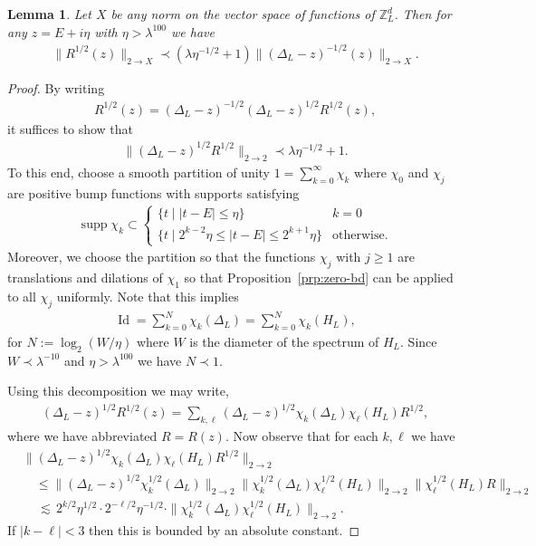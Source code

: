 \documentclass[11pt]{amsart}
\def\bbZ{{\mathbb Z}}
\newcommand{\Id}{{\operatorname*{Id}}}
\newcommand{\supp}{\operatorname*{supp}}
\def\lsim{{\,\lesssim\,}}
\newcommand{\ldom}{\prec}
\numberwithin{equation}{section}
\numberwithin{theorem}{section}
\newtheorem{lemma}[theorem]{Lemma}
\begin{document}
\begin{lemma}
\label{lem:two-to-p-transfer}
Let $X$ be any norm on the vector space of functions of $\bbZ^d_L$.
Then for any $z = E+i\eta$ with $\eta>\lambda^{100}$ we have
\begin{align*}
\|R^{1 /2}(z)\|_{2\to X} \ldom (\lambda \eta^{-1/ 2}+1)\|(\Delta_L-z)^{-1 /2}(z)\|_{2\to X}.
\end{align*}
\end{lemma}
\begin{proof}
By writing
\begin{align*}
	R^{1 /2}(z)=(\Delta_L-z)^{-1 /2}(\Delta_L-z)^{1 /2}R^{1 /2}(z),
\end{align*}
it suffices to show that
\begin{align*}
\|(\Delta_L-z)^{1 /2}R^{1/2}\|_{2\to 2}\prec \lambda \eta^{-1/ 2} + 1.
\end{align*}
To this end, choose a smooth partition of unity $1 = \sum_{k=0}^\infty \chi_k$ where $\chi_0$ and $\chi_j$ are positive bump functions with  supports satisfying
\begin{align*}
\supp \chi_k \subset \begin{cases}
	\{t\mid |t-E|\leq\eta\} &k=0\\
	\{t \mid 2^{k-2}\eta\leq |t-E|\leq 2^{k+1}\eta\} &\text{otherwise}.
\end{cases}
\end{align*}
Moreover, we choose the partition so that the functions $\chi_j$ with $j\geq 1$ are translations and dilations of $\chi_1$ so that Proposition~\ref{prp:zero-bd} can be applied to all $\chi_j$ uniformly.
Note that this implies
\begin{align*}
	\Id=\sum_{k=0}^N\chi_k(\Delta_L)=\sum_{k=0}^N\chi_k(H_L),
\end{align*}
for $N := \log_2 (W/\eta)$ where $W$ is the diameter of the spectrum of $H_L$.
Since $W\ldom \lambda^{-10}$ and $\eta > \lambda^{100}$ we have
$N\ldom 1$.

Using this decomposition we may write,
\begin{align*}
	(\Delta_L-z)^{1 /2}R^{1 /2}(z)=\sum_{k,\ell}(\Delta_L-z)^{1 /2}\chi_k(\Delta_L)\chi_\ell(H_L)R^{1 /2},
\end{align*}
where we have abbreviated $R=R(z)$.
Now observe that for each $k,\ell$ we have
\begin{align*}
&\|(\Delta_L-z)^{1 /2}\chi_k(\Delta_L)\chi_\ell(H_L)R^{1 /2}\|_{2\to 2} \\
& \quad\leq\|(\Delta_L-z)^{1/2}\chi^{1 /2}_k(\Delta_L)\|_{2\to 2}\|\chi^{1 /2}_k(\Delta_L)\chi^{1 /2}_\ell(H_L)\|_{2\to 2}
\|\chi_{\ell}^{1 /2}(H_L)R\|_{2\to 2}\\
&\quad\lsim 2^{k / 2}\eta^{1 /2} \cdot 2^{-\ell / 2}\eta^{-1 / 2}\cdot \|\chi^{1 /2}_k(\Delta_L)\chi^{1 /2}_\ell(H_L)\|_{2\to 2}.
\end{align*}
If $|k-\ell|<3$ then this is bounded by an absolute constant.


\end{proof}
\end{document}
